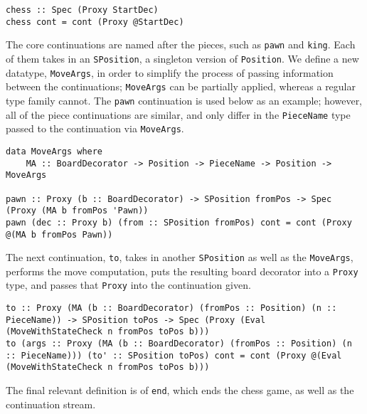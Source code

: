 \documentclass[12pt, a4paper, bibliography=totocnumbered]{scrartcl}
\begin{document}
\begin{lstlisting}
chess :: Spec (Proxy StartDec)
chess cont = cont (Proxy @StartDec)
\end{lstlisting}

The core continuations are named after the pieces, such as \lstinline[basicstyle=\ttfamily]{pawn} and \lstinline[basicstyle=\ttfamily]{king}. Each of them takes in an \lstinline[basicstyle=\ttfamily]{SPosition}, a singleton version of \lstinline[basicstyle=\ttfamily]{Position}. We define a new datatype, \lstinline[basicstyle=\ttfamily]{MoveArgs}, in order to simplify the process of passing information between the continuations; \lstinline[basicstyle=\ttfamily]{MoveArgs} can be partially applied, whereas a regular type family cannot. The \lstinline[basicstyle=\ttfamily]{pawn} continuation is used below as an example; however, all of the piece continuations are similar, and only differ in the \lstinline[basicstyle=\ttfamily]{PieceName} type passed to the continuation via \lstinline[basicstyle=\ttfamily]{MoveArgs}.

\begin{lstlisting}
data MoveArgs where
    MA :: BoardDecorator -> Position -> PieceName -> Position -> MoveArgs

pawn :: Proxy (b :: BoardDecorator) -> SPosition fromPos -> Spec (Proxy (MA b fromPos 'Pawn))
pawn (dec :: Proxy b) (from :: SPosition fromPos) cont = cont (Proxy @(MA b fromPos Pawn))
\end{lstlisting}

The next continuation, \lstinline[basicstyle=\ttfamily]{to}, takes in another \lstinline[basicstyle=\ttfamily]{SPosition} as well as the \lstinline{MoveArgs}, performs the move computation, puts the resulting board decorator into a \lstinline[basicstyle=\ttfamily]{Proxy} type, and passes that \lstinline[basicstyle=\ttfamily]{Proxy} into the continuation given.

\begin{lstlisting}
to :: Proxy (MA (b :: BoardDecorator) (fromPos :: Position) (n :: PieceName)) -> SPosition toPos -> Spec (Proxy (Eval (MoveWithStateCheck n fromPos toPos b)))
to (args :: Proxy (MA (b :: BoardDecorator) (fromPos :: Position) (n :: PieceName))) (to' :: SPosition toPos) cont = cont (Proxy @(Eval (MoveWithStateCheck n fromPos toPos b)))
\end{lstlisting}

The final relevant definition is of \lstinline[basicstyle=\ttfamily]{end}, which ends the chess game, as well as the continuation stream.
\end{document}
